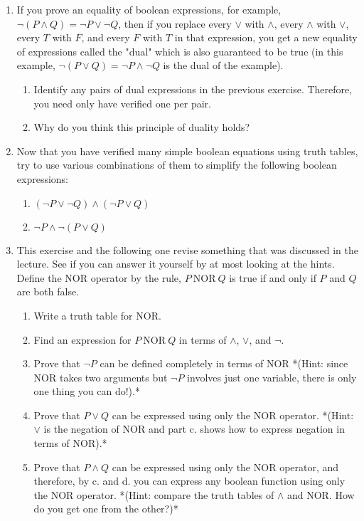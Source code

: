 \documentclass[a4paper]{article}
\begin{document}
\begin{enumerate}
\item If you prove an equality of boolean expressions, for example, $\neg (P \land Q) = \neg P \lor \neg Q$, then if you replace every $\lor$ with $\land$, every $\land$ with $\lor$, every $T$ with $F$, and every $F$ with $T$ in that expression, you get a new equality of expressions called the "dual" which is also guaranteed to be true (in this example, $\neg (P \lor Q) = \neg P \land \neg Q$ is the dual of the example).
  \begin{enumerate}
   \item Identify any pairs of dual expressions in the previous exercise. Therefore, you need only have verified one per pair.
   \item Why do you think this principle of duality holds?
  \end{enumerate}

\item Now that you have verified many simple boolean equations using truth tables, try to use various combinations of them to simplify the following boolean expressions:
  \begin{enumerate}
   \item $(\neg P \lor \neg Q) \land (\neg P \lor Q)$
   \item $\neg P \land \neg (P \lor Q)$
  \end{enumerate}

\item This exercise and the following one revise something that was discussed in the lecture. See if you can answer it yourself by at most looking at the hints. Define the $\mathrm{NOR}$ operator by the rule, $P\ \mathrm{NOR}\ Q$ is true if and only if $P$ and $Q$ are both false.
  \begin{enumerate}
    \item Write a truth table for $\mathrm{NOR}$.
    \item Find an expression for $P\ \mathrm{NOR}\ Q$ in terms of $\land$, $\lor$, and $\neg$.
    \item Prove that $\neg P$ can be defined completely in terms of $\mathrm{NOR}$ *(Hint: since $\mathrm{NOR}$ takes two arguments but $\neg P$ involves just one variable, there is only one thing you can do!).*
    \item Prove that $P \lor Q$ can be expressed using only the $\mathrm{NOR}$ operator. *(Hint: $\lor$ is the negation of $\mathrm{NOR}$ and part c. shows how to express negation in terms of $\mathrm{NOR}$).*
    \item Prove that $P \land Q$ can be expressed using only the $\mathrm{NOR}$ operator, and therefore, by c. and d. you can express any boolean function using only the $\mathrm{NOR}$ operator. *(Hint: compare the truth tables of $\land$ and $\mathrm{NOR}$. How do you get one from the other?)*
  \end{enumerate}


\end{enumerate}
\end{document}
